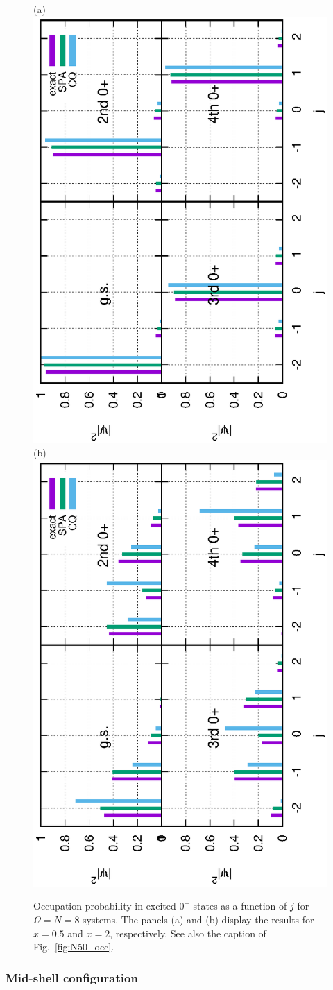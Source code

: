 \documentclass[%
superscriptaddress,
preprint,
showpacs,
nofootinbib,
amsmath,amssymb,
aps,
prc,
floatfix ]%
{revtex4-1}
\begin{document}
\begin{figure}[htbp]
 \begin{minipage}{1\hsize}
 \begin{center}
 (a)  \includegraphics[height=0.46\textwidth,angle=-90]{images/N8Xeq0p5occ_wo_adiabatic.eps}
 (b)  \includegraphics[height=0.46\textwidth,angle=-90]{images/N8Xeq2occ_wo_adiabatic.eps}
 \end{center}
 \end{minipage}
 \caption{
Occupation probability in excited $0^+$ states
as a function of $j$ for $\Omega=N=8$ systems.
The panels (a) and (b) display the results for $x=0.5$ and $x=2$,
respectively. 
See also the caption of Fig.~\ref{fig:N50_occ}.
}
 \label{fig:N8_occ}
\end{figure}


\subsubsection{Mid-shell configuration}
\end{document}
